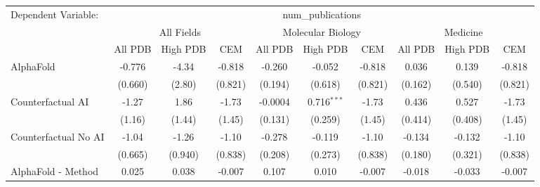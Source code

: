 \begingroup
\centering
\begin{tabular}{lccccccccc}
   \tabularnewline \midrule \midrule
   Dependent Variable: & \multicolumn{9}{c}{num\_publications}\\
 & \multicolumn{3}{c}{All Fields} & \multicolumn{3}{c}{Molecular Biology} & \multicolumn{3}{c}{Medicine} \\
\cmidrule(lr){2-7} \cmidrule(lr){5-10} \cmidrule(lr){8-7}
 & \multicolumn{1}{c}{All PDB} & \multicolumn{1}{c}{High PDB} & \multicolumn{1}{c}{CEM} & \multicolumn{1}{c}{All PDB} & \multicolumn{1}{c}{High PDB} & \multicolumn{1}{c}{CEM} & \multicolumn{1}{c}{All PDB} & \multicolumn{1}{c}{High PDB} & \multicolumn{1}{c}{CEM} \\
\cmidrule(lr){2-3} \cmidrule(lr){3-4} \cmidrule(lr){4-5} \cmidrule(lr){5-6} \cmidrule(lr){6-7} \cmidrule(lr){7-8} \cmidrule(lr){8-9} \cmidrule(lr){9-10} \cmidrule(lr){10-3}
   AlphaFold                                                   & -0.776          & -4.34           & -0.818         & -0.260        & -0.052        & -0.818         & 0.036          & 0.139         & -0.818\\   
                                                               & (0.660)         & (2.80)          & (0.821)        & (0.194)       & (0.618)       & (0.821)        & (0.162)        & (0.540)       & (0.821)\\   
   Counterfactual AI                                           & -1.27           & 1.86            & -1.73          & -0.0004       & 0.716$^{***}$ & -1.73          & 0.436          & 0.527         & -1.73\\   
                                                               & (1.16)          & (1.44)          & (1.45)         & (0.131)       & (0.259)       & (1.45)         & (0.414)        & (0.408)       & (1.45)\\   
   Counterfactual No AI                                        & -1.04           & -1.26           & -1.10          & -0.278        & -0.119        & -1.10          & -0.134         & -0.132        & -1.10\\   
                                                               & (0.665)         & (0.940)         & (0.838)        & (0.208)       & (0.273)       & (0.838)        & (0.180)        & (0.321)       & (0.838)\\   
   AlphaFold - Method                                          & 0.025           & 0.038           & -0.007         & 0.107         & 0.010         & -0.007         & -0.018         & -0.033        & -0.007\\   

\end{tabular}
